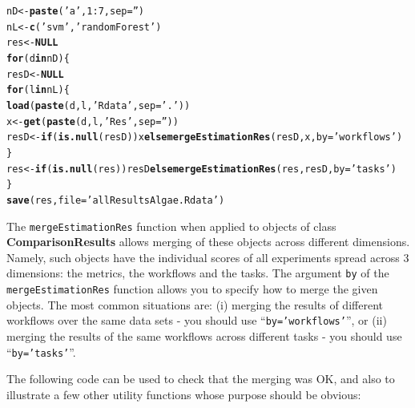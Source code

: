 \documentclass[10pt,a4paper]{article}\usepackage[]{graphicx}\usepackage[]{color}
\makeatletter
\newcommand{\hlnum}[1]{\textcolor[rgb]{0.686,0.059,0.569}{#1}}%
\newcommand{\hlstr}[1]{\textcolor[rgb]{0.192,0.494,0.8}{#1}}%
\newcommand{\hlopt}[1]{\textcolor[rgb]{0,0,0}{#1}}%
\newcommand{\hlstd}[1]{\textcolor[rgb]{0.345,0.345,0.345}{#1}}%
\newcommand{\hlkwa}[1]{\textcolor[rgb]{0.161,0.373,0.58}{\textbf{#1}}}%
\newcommand{\hlkwb}[1]{\textcolor[rgb]{0.69,0.353,0.396}{#1}}%
\newcommand{\hlkwc}[1]{\textcolor[rgb]{0.333,0.667,0.333}{#1}}%
\newcommand{\hlkwd}[1]{\textcolor[rgb]{0.737,0.353,0.396}{\textbf{#1}}}%
\newenvironment{kframe}{%
 \def\at@end@of@kframe{}%
 \ifinner\ifhmode%
  \def\at@end@of@kframe{\end{minipage}}%
  \begin{minipage}{\columnwidth}%
 \fi\fi%
 \def\FrameCommand##1{\hskip\@totalleftmargin \hskip-\fboxsep
 \colorbox{shadecolor}{##1}\hskip-\fboxsep
     \hskip-\linewidth \hskip-\@totalleftmargin \hskip\columnwidth}%
 \MakeFramed {\advance\hsize-\width
   \@totalleftmargin\z@ \linewidth\hsize
   \@setminipage}}%
 {\par\unskip\endMakeFramed%
 \at@end@of@kframe}
\newenvironment{knitrout}{}{} %
\makeatother
\begin{document}
\begin{knitrout}\footnotesize
{}\color{fgcolor}\begin{kframe}
\begin{alltt}
\hlstd{nD} \hlkwb{<-} \hlkwd{paste}\hlstd{(}\hlstr{'a'}\hlstd{,}\hlnum{1}\hlopt{:}\hlnum{7}\hlstd{,}\hlkwc{sep}\hlstd{=}\hlstr{''}\hlstd{)}
\hlstd{nL} \hlkwb{<-} \hlkwd{c}\hlstd{(}\hlstr{'svm'}\hlstd{,}\hlstr{'randomForest'}\hlstd{)}
\hlstd{res} \hlkwb{<-} \hlkwa{NULL}
\hlkwa{for}\hlstd{(d} \hlkwa{in} \hlstd{nD) \{}
  \hlstd{resD} \hlkwb{<-} \hlkwa{NULL}
  \hlkwa{for}\hlstd{(l} \hlkwa{in} \hlstd{nL) \{}
    \hlkwd{load}\hlstd{(}\hlkwd{paste}\hlstd{(d,l,}\hlstr{'Rdata'}\hlstd{,}\hlkwc{sep}\hlstd{=}\hlstr{'.'}\hlstd{))}
    \hlstd{x} \hlkwb{<-} \hlkwd{get}\hlstd{(}\hlkwd{paste}\hlstd{(d,l,}\hlstr{'Res'}\hlstd{,}\hlkwc{sep}\hlstd{=}\hlstr{''}\hlstd{))}
    \hlstd{resD} \hlkwb{<-} \hlkwa{if} \hlstd{(}\hlkwd{is.null}\hlstd{(resD)) x} \hlkwa{else} \hlkwd{mergeEstimationRes}\hlstd{(resD,x,}\hlkwc{by}\hlstd{=}\hlstr{'workflows'}\hlstd{)}
  \hlstd{\}}
  \hlstd{res} \hlkwb{<-} \hlkwa{if} \hlstd{(}\hlkwd{is.null}\hlstd{(res)) resD} \hlkwa{else} \hlkwd{mergeEstimationRes}\hlstd{(res,resD,}\hlkwc{by}\hlstd{=}\hlstr{'tasks'}\hlstd{)}
\hlstd{\}}
\hlkwd{save}\hlstd{(res,}\hlkwc{file}\hlstd{=}\hlstr{'allResultsAlgae.Rdata'}\hlstd{)}
\end{alltt}
\end{kframe}
\end{knitrout}

The \texttt{mergeEstimationRes}  function when applied to objects of class
\textbf{ComparisonResults} allows merging of these objects across different
dimensions. Namely, such objects have the individual scores of all
experiments spread across 3 dimensions:  the
metrics, the workflows and the tasks. The argument
\texttt{by} of the \texttt{mergeEstimationRes} function allows you to specify how
to merge the given objects. The most common situations are: (i)
merging the results of different workflows over the same data sets -
you should use ``\texttt{by='workflows'}'', or (ii) merging the results
of the same workflows across different tasks - you should use
``\texttt{by='tasks'}''.

The following code can be used to check that the merging was OK, and
also to illustrate a few other utility functions whose purpose should
be obvious:
\end{document}

